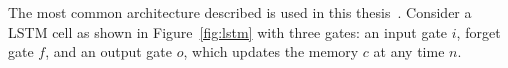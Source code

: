 \documentclass{WitsPhysicsReport}
\begin{document}

The most common architecture described is used in this thesis~\cite{graves2012supervised}. Consider a LSTM cell as shown in Figure~\ref{fig:lstm} with three gates: an input gate $i$,  forget gate $f$, and an output gate $o$, which updates the  memory $c$ at any time $n$.
\end{document}
